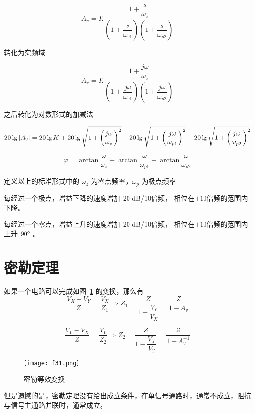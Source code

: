 \documentclass[cn,11pt,chinese,black,simple]{../elegantbook}
\begin{document}
\[A_v = K \frac{1 + \dfrac{s}{\omega_z}}{\left(1 + \dfrac{s}{\omega_{p1}}\right)\left(1 + \dfrac{s}{\omega_{p2}}\right)}\]

转化为实频域


\[A_v = K \frac{1 + \dfrac{j \omega}{\omega_z}}{\left(1 + \dfrac{j \omega}{\omega_{p1}}\right)\left(1 + \dfrac{j \omega}{\omega_{p2}}\right)}\]

之后转化为对数形式的加减法

\[20 \lg \left| A_v \right| = 20 \lg K + 20 \lg \sqrt{1 + \left(\dfrac{j \omega}{\omega_z}\right)^2} - 20 \lg \sqrt{1 + \left(\dfrac{j \omega}{\omega_{p1}}\right)^2} - 20 \lg \sqrt{1 + \left(\dfrac{j \omega}{\omega_{p2}}\right)^2}\] 

\[\varphi = \arctan\dfrac{\omega}{\omega_z} - \arctan\dfrac{\omega}{\omega_{p1}} - \arctan\dfrac{\omega}{\omega_{p2}}  \]


\begin{definition}[频响零极点]
    定义以上的标准形式中的 \(\omega_z\) 为零点频率，\(\omega_p\) 为极点频率
\end{definition}

每经过一个极点，增益下降的速度增加 20 dB/10倍频，
相位在\(\pm 10\)倍频的范围内下降。

每经过一个零点，增益上升的速度增加 20 dB/10倍频，
相位在\(\pm 10\)倍频的范围内上升 \(90^{\circ}\) 。

\section{密勒定理}

\begin{theorem}[密勒定理]
    如果一个电路可以完成如图~\ref{fig:ch5:1} 的变换，那么有
    \[\frac{V_X-V_Y}{Z} = \frac{V_X}{Z_1} \Rightarrow Z_1 = \frac{Z}{1 - \dfrac{V_Y}{V_X}} = \frac{Z}{1 - A_v}\]

    \[\frac{V_Y-V_X}{Z} = \frac{V_Y}{Z_2} \Rightarrow Z_2 = \frac{Z}{1 - \dfrac{V_X}{V_Y}} = \frac{Z}{1 - A_v^{-1}}\]
\end{theorem}

\begin{figure}[htb]
    \centering
    \texttt{[image: f31.png]}
    \caption{密勒等效变换}
    \label{fig:ch5:1}
\end{figure}

但是遗憾的是，密勒定理没有给出成立条件，在单信号通路时，通常不成立，阻抗与信号主通路并联时，通常成立。

\end{document}
